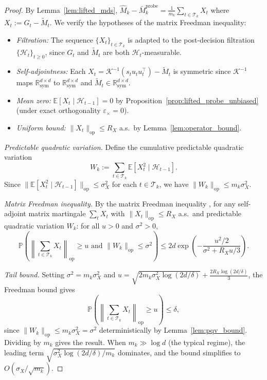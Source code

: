 \documentclass[12pt]{article}
\newcommand{\E}{\mathbb{E}}
\newcommand{\Prob}{\mathbb{P}}
\newcommand{\op}{\mathrm{op}}
\newcommand{\cH}{\mathcal{H}}
\newcommand{\cT}{\mathcal{T}}
\newcommand{\Rsy}{\mathbb{R}^{d\times d}_{\mathrm{sym}}}
\theoremstyle{plain}
\theoremstyle{definition}
\begin{document}
\begin{proof}
By Lemma~\ref{lem:lifted_mds}, $\widehat{M}_k - \bar{M}_k^{\mathrm{probe}} = \frac{1}{m_k}\sum_{t \in \cT_k} X_t$ where $X_t := G_t - \widetilde{M}_t$. We verify the hypotheses of the matrix Freedman inequality:
\begin{itemize}[nosep]
\item \emph{Filtration:} The sequence $\{X_t\}_{t \in \cT_k}$ is adapted to the post-decision filtration $\{\cH_t\}_{t \ge 0}$, since $G_t$ and $\widetilde{M}_t$ are both $\cH_t$-measurable.
\item \emph{Self-adjointness:} Each $X_t = \mathcal{K}^{-1}(s_t u_t u_t^\top) - \widetilde{M}_t$ is symmetric since $\mathcal{K}^{-1}$ maps $\Rsy$ to $\Rsy$ and $\widetilde{M}_t \in \Rsy$.
\item \emph{Mean zero:} $\E[X_t \mid \cH_{t-1}] = 0$ by Proposition~\ref{prop:lifted_probe_unbiased} (under exact orthogonality $\varepsilon_\times = 0$).
\item \emph{Uniform bound:} $\|X_t\|_{\op} \le R_X$ a.s.\ by Lemma~\ref{lem:operator_bound}.
\end{itemize}

\emph{Predictable quadratic variation.}
Define the cumulative predictable quadratic variation
\[
W_k := \sum_{t \in \cT_k} \E[X_t^2 \mid \cH_{t-1}].
\]
Since $\|\E[X_t^2 \mid \cH_{t-1}]\|_{\op} \le \sigma_X^2$ for each $t \in \cT_k$, we have $\|W_k\|_{\op} \le m_k \sigma_X^2$.

\emph{Matrix Freedman inequality.}
By the matrix Freedman inequality \citep[Theorem~1.6]{tropp2012user}, for any self-adjoint matrix martingale $\sum_{t} X_t$ with $\|X_t\|_{\op} \le R_X$ a.s.\ and predictable quadratic variation $W_k$: for all $u > 0$ and $\sigma^2 > 0$,
\[
\Prob\!\left(\left\|\sum_{t \in \cT_k} X_t\right\|_{\op} \ge u \text{ and } \|W_k\|_{\op} \le \sigma^2\right)
\le 2d \exp\!\left(-\frac{u^2/2}{\sigma^2 + R_X u/3}\right).
\]

\emph{Tail bound.}
Setting $\sigma^2 = m_k \sigma_X^2$ and $u = \sqrt{2m_k \sigma_X^2 \log(2d/\delta)} + \frac{2R_X \log(2d/\delta)}{3}$, the Freedman bound gives
\[
\Prob\!\left(\left\|\sum_{t \in \cT_k} X_t\right\|_{\op} \ge u\right) \le \delta,
\]
since $\|W_k\|_{\op} \le m_k \sigma_X^2 = \sigma^2$ deterministically by Lemma~\ref{lem:pqv_bound}. Dividing by $m_k$ gives the result. When $m_k \gg \log d$ (the typical regime), the leading term $\sqrt{\sigma_X^2 \log(2d/\delta)/m_k}$ dominates, and the bound simplifies to $O(\sigma_X / \sqrt{m_k})$.
\end{proof}
\end{document}
